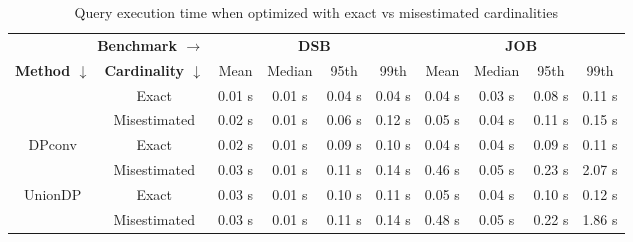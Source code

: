 
\begin{table}
    \begin{footnotesize}

\begin{tabular}{cc|cccc|cccc}
    \hline
    \multicolumn{2}{r|}{\textbf{Benchmark $\rightarrow$}}
        & \multicolumn{4}{c|}{\textbf{DSB}} & \multicolumn{4}{c}{\textbf{JOB}} \\
    \textbf{Method $\downarrow$} & \textbf{Cardinality $\downarrow$}
        & Mean & Median & 95th & 99th & Mean & Median & 95th & 99th \\
    \hline
    \multirow{2}{*}{\sys{}}
        & Exact & 0.01 s & 0.01 s & 0.04 s & 0.04 s & 0.04 s & 0.03 s & 0.08 s & 0.11 s \\
        & Misestimated & 0.02 s & 0.01 s & 0.06 s & 0.12 s & 0.05 s & 0.04 s & 0.11 s & 0.15 s \\
    \hline
    \multirow{2}{*}{DPconv}
        & Exact & 0.02 s & 0.01 s & 0.09 s & 0.10 s & 0.04 s & 0.04 s & 0.09 s & 0.11 s \\
        & Misestimated & 0.03 s & 0.01 s & 0.11 s & 0.14 s & 0.46 s & 0.05 s & 0.23 s & 2.07 s \\
    \hline
    \multirow{2}{*}{UnionDP}
        & Exact & 0.03 s & 0.01 s & 0.10 s & 0.11 s & 0.05 s & 0.04 s & 0.10 s & 0.12 s \\
        & Misestimated & 0.03 s & 0.01 s & 0.11 s & 0.14 s & 0.48 s & 0.05 s & 0.22 s & 1.86 s \\
    \hline
\end{tabular}

    \end{footnotesize}
    \caption{Query execution time when optimized with exact vs misestimated cardinalities}
    \label{tab:misestimation}
\end{table}